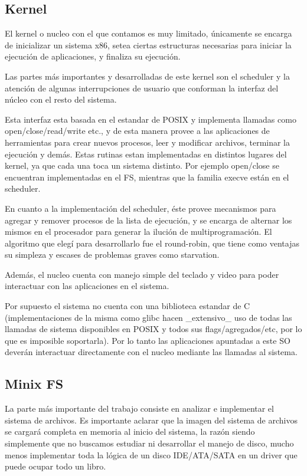 \subsection{Kernel}

El kernel o nucleo con el que contamos es muy limitado, únicamente se encarga de
inicializar un sistema x86, setea ciertas estructuras necesarias para iniciar la
ejecución de aplicaciones, y finaliza su ejecución.

Las partes más importantes y desarrolladas de este kernel son el scheduler y la
atención de algunas interrupciones de usuario que conforman la interfaz del
núcleo con el resto del sistema.

Esta interfaz esta basada en el estandar de POSIX y implementa llamadas como
open/close/read/write etc., y de esta manera provee a las aplicaciones de
herramientas para crear nuevos procesos, leer y modificar archivos, terminar
la ejecución y demás. Estas rutinas estan implementadas en distintos lugares
del kernel, ya que cada una toca un sistema distinto. Por ejemplo open/close
se encuentran implementadas en el FS, mientras que la familia execve están en
el scheduler.

En cuanto a la implementación del scheduler, éste provee mecanismos para agregar
y remover procesos de la lista de ejecución, y se encarga de alternar los mismos
en el procesador para generar la ilución de multiprogramación. El algoritmo que
elegí para desarrollarlo fue el round-robin, que tiene como ventajas su simpleza
y escases de problemas graves como starvation.

Además, el nucleo cuenta con manejo simple del teclado y video para poder
interactuar con las aplicaciones en el sistema.

Por supuesto el sistema no cuenta con una biblioteca estandar de C
(implementaciones de la misma como glibc hacen \_extensivo\_ uso de todas las
llamadas de sistema disponibles en POSIX y todos sus flags/agregados/etc, por lo
que es imposible soportarla). Por lo tanto las aplicaciones apuntadas a este SO
deverán interactuar directamente con el nucleo mediante las llamadas al sistema.

\subsection{Minix FS}

La parte más importante del trabajo consiste en analizar e implementar el
sistema de archivos. Es importante aclarar que la imagen del sistema de archivos
se cargará completa en memoria al inicio del sistema, la razón siendo
simplemente que no buscamos estudiar ni desarrollar el manejo de disco, mucho
menos implementar toda la lógica de un disco IDE/ATA/SATA en un driver  que puede
ocupar todo un libro.

